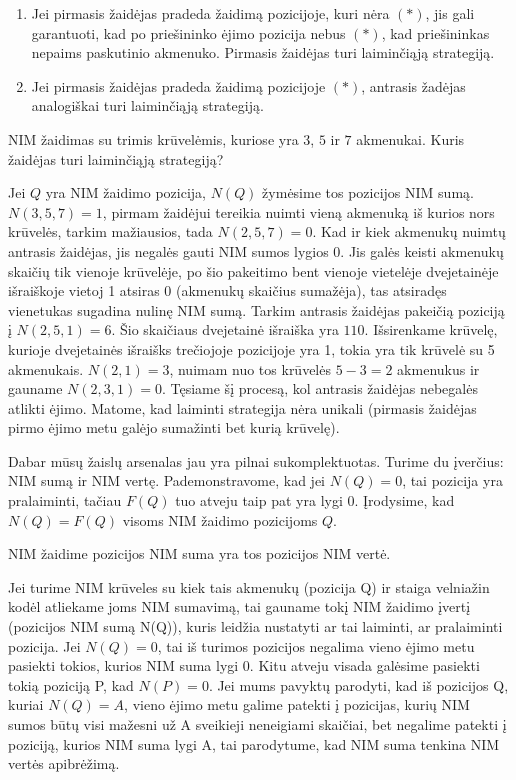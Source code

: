 \begin{enumerate}
  \item Jei pirmasis žaidėjas pradeda žaidimą pozicijoje, kuri nėra $(*)$,
    jis gali garantuoti, kad po priešininko ėjimo pozicija nebus $(*)$, kad
    priešininkas nepaims paskutinio akmenuko. Pirmasis žaidėjas turi
    laiminčiąją strategiją.
  \item Jei pirmasis žaidėjas pradeda žaidimą pozicijoje $(*)$, antrasis
    žadėjas analogiškai turi laiminčiąją strategiją. 
\end{enumerate}

\begin{pavnr}
  NIM žaidimas su trimis krūvelėmis, kuriose yra $3$, $5$ ir $7$ akmenukai. Kuris
  žaidėjas turi laiminčiąją strategiją?
\end{pavnr}

\begin{sprendimas}
Jei $Q$ yra NIM žaidimo pozicija, $N(Q)$ žymėsime tos pozicijos NIM sumą. $N(3,5,7)=1$, pirmam žaidėjui tereikia nuimti vieną akmenuką iš kurios nors krūvelės, tarkim mažiausios, tada $N(2,5,7)=0$. Kad ir kiek akmenukų nuimtų
antrasis žaidėjas, jis negalės gauti NIM sumos lygios 0. Jis galės keisti akmenukų skaičių tik vienoje krūvelėje, po šio pakeitimo bent vienoje vietelėje dvejetainėje išraiškoje vietoj 1 atsiras 0 (akmenukų skaičius sumažėja), 
tas atsiradęs vienetukas sugadina nulinę NIM sumą. Tarkim antrasis žaidėjas pakeičią poziciją į $N(2,5,1)=6$. Šio skaičiaus dvejetainė išraiška yra $110$. Išsirenkame krūvelę, 
kurioje dvejetainės išraišks trečiojoje pozicijoje yra 1, tokia yra tik krūvelė su 5 akmenukais. $N(2,1)=3$, nuimam nuo tos krūvelės $5-3=2$ akmenukus ir gauname $N(2,3,1)=0$. 
Tęsiame šį procesą, kol antrasis žaidėjas nebegalės atlikti ėjimo. Matome, kad laiminti strategija nėra unikali (pirmasis žaidėjas pirmo ėjimo metu galėjo sumažinti bet kurią krūvelę).
 \end{sprendimas}

Dabar mūsų žaislų arsenalas jau yra pilnai sukomplektuotas. Turime du įverčius: NIM sumą ir NIM vertę. Pademonstravome, kad jei $N(Q)=0$, tai pozicija yra pralaiminti, 
tačiau $F(Q)$ tuo atveju taip pat yra lygi $0$. Įrodysime, kad $N(Q)=F(Q)$ visoms NIM žaidimo pozicijoms $Q$. 

\begin{thm}
  NIM žaidime pozicijos NIM suma yra tos pozicijos NIM vertė. 
\end{thm}

Jei turime NIM krūveles su kiek tais akmenukų (pozicija Q) ir staiga velniažin kodėl atliekame joms NIM sumavimą, tai gauname
tokį NIM žaidimo įvertį (pozicijos NIM sumą N(Q)), kuris leidžia nustatyti ar tai
laiminti, ar pralaiminti pozicija. Jei $N(Q)=0$, tai iš turimos pozicijos
negalima vieno ėjimo metu pasiekti tokios, kurios NIM suma lygi 0. Kitu atveju visada galėsime pasiekti tokią poziciją P, kad $N(P)=0$.
Jei mums pavyktų parodyti, kad iš pozicijos Q, kuriai $N(Q)=A$,
vieno ėjimo metu galime patekti į pozicijas, kurių NIM sumos būtų visi mažesni
už A sveikieji neneigiami skaičiai, bet negalime patekti į poziciją, kurios NIM
suma lygi A, tai parodytume, kad NIM suma tenkina NIM vertės apibrėžimą.

